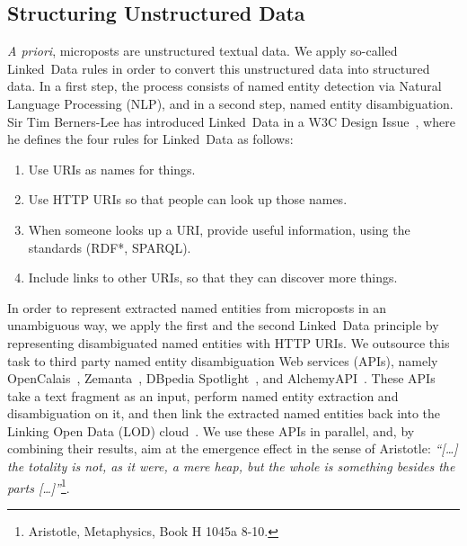 \documentclass{iosart2c}
\begin{document}
\subsection{Structuring Unstructured Data} \label{sec:services}
\textit{A priori}, microposts are unstructured textual data.
We apply so-called Linked~Data rules in order to convert this unstructured data into structured data.
In a first step, the process consists of named entity detection via Natural Language Processing (NLP), and in a second step, named entity disambiguation.
Sir Tim Berners-Lee has introduced Linked~Data in a W3C Design Issue~\cite{TimBL:LinkedData}, where he defines the four rules for Linked~Data as follows:
\begin{enumerate}
\item Use URIs as names for things.
\item Use HTTP URIs so that people can look up those names.
\item When someone looks up a URI, provide useful information, using the standards (RDF*, SPARQL).
\item Include links to other URIs, so that they can discover more things.
\end{enumerate}
In order to represent extracted named entities from microposts in an unambiguous way, we apply the first and the second Linked~Data principle by representing disambiguated named entities with HTTP URIs.
We outsource this task to third party named entity disambiguation Web services (APIs), namely OpenCalais~\cite{OpenCalais}, Zemanta~\cite{Zemanta}, DBpedia Spotlight~\cite{Spotlight}, and AlchemyAPI~\cite{AlchemyApi}.
These APIs take a text fragment as an input, perform named entity extraction and disambiguation on it, and then link the extracted named entities back into the Linking Open Data (LOD) cloud~\cite{LODcloud}.
We use these APIs in parallel, and, by combining their results, aim at the emergence effect in the sense of Aristotle: \emph{``[\ldots] the totality is not, as it were, a mere heap, but the whole is something besides the parts [\ldots]''}\footnote{Aristotle, Metaphysics, Book H 1045a 8-10.}. 
\end{document}
